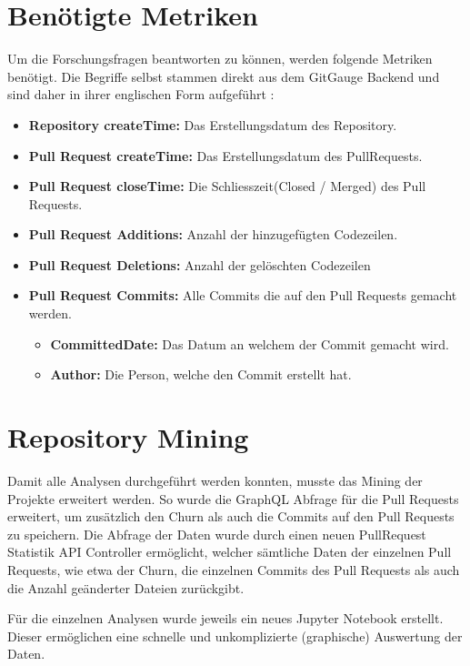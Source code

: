 \section{Benötigte Metriken}
Um die Forschungsfragen beantworten zu können, werden folgende Metriken benötigt. Die Begriffe selbst stammen direkt aus dem GitGauge Backend und sind daher in ihrer englischen Form aufgeführt \parencite{noauthor_repo-detectivesgitgauge-extractor-service_nodate}:
\label{sec:Metriken}
\begin{itemize}
    \item \textbf{Repository createTime:} Das Erstellungsdatum des Repository.
    \item \textbf{Pull Request createTime:} Das Erstellungsdatum des PullRequests.
    \item \textbf{Pull Request closeTime:} Die Schliesszeit(Closed / Merged) des Pull Requests.
    \item \textbf{Pull Request Additions:} Anzahl der hinzugefügten Codezeilen.
    \item \textbf{Pull Request Deletions:} Anzahl der gelöschten Codezeilen
      \item \textbf{Pull Request Commits:} Alle Commits die auf den Pull Requests gemacht werden.
     \begin{itemize}
        \item \textbf{CommittedDate:} Das Datum an welchem der Commit gemacht wird.
        \item \textbf{Author:} Die Person, welche den Commit erstellt hat.
    \end{itemize}
\end{itemize}

\section{Repository Mining}
Damit alle Analysen durchgeführt werden konnten, musste das Mining der Projekte erweitert werden. So wurde die GraphQL Abfrage für die Pull Requests erweitert, um zusätzlich den Churn als auch die Commits auf den Pull Requests zu speichern. Die Abfrage der Daten wurde durch einen neuen PullRequest Statistik API Controller ermöglicht, welcher sämtliche Daten der einzelnen Pull Requests, wie etwa der Churn, die einzelnen Commits des Pull Requests als auch die Anzahl geänderter Dateien zurückgibt. 

Für die einzelnen Analysen wurde jeweils ein neues Jupyter Notebook erstellt. Dieser ermöglichen eine schnelle und unkomplizierte (graphische) Auswertung der Daten. \parencite{noauthor_repo-detectivesba-metric-analysis-scripts_nodate}


